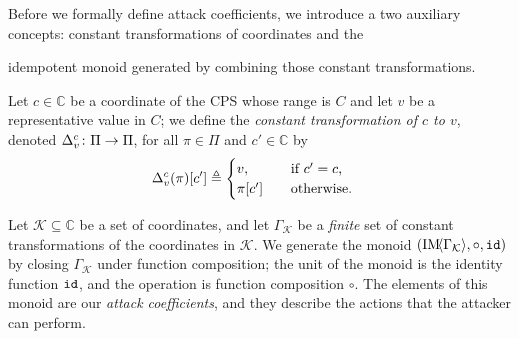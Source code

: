 Before we formally define attack coefficients, we introduce a two auxiliary concepts: {constant transformations of coordinates} and the {idempotent monoid generated by combining those constant transformations.
\begin{definition}
  Let $c\in \mathbb{C}$ be a coordinate of the CPS whose range is $C$ and let $v$ be a representative value in $C$; we define the \emph{constant transformation of $c$ to $v$}, denoted ${\Delta}^{c}_{v}\colon \Pi\rightarrow \Pi$, for all $\pi \in \Pi$ and $c'\in \mathbb{C}$ by
  \begin{align}
    {\Delta}^{c}_{v}(\pi)[c']& \triangleq 
    \begin{cases}
     v, &\quad \text{if $c'=c$,}\\
     \pi[c']&\quad \text{otherwise.}
    \end{cases} 
  \end{align} 
\end{definition}

\begin{definition}
  \label{def:CPSRobustness:IdempotentMonoid}

Let $\mathcal{K}\subseteq\mathbb{C}$ be a set of coordinates, and let $\Gamma_\mathcal{K}$ be a \emph{finite} set of constant transformations of the coordinates in $\mathcal{K}$. We generate the monoid $(\text{IM}\!{{\left<\Gamma_{\mathcal{K}}\right>}},\circ,{\texttt{id}})$ %
by closing %
$\Gamma_{\mathcal{K}}$ under function composition; the unit of the monoid is the identity function ${\texttt{id}}$, and the operation is function composition $\circ$. The elements of this monoid are our \emph{attack coefficients}, and they describe the actions that the attacker can perform.


\end{definition}}

